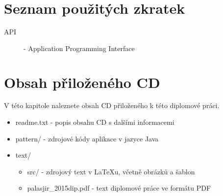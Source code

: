 \documentclass[11pt,twoside,a4paper]{book}
\begin{document}
\appendix


\chapter{Seznam použitých zkratek}

\begin{description}
\item[API] - Application Programming Interface 
\end{description}

\chapter{Obsah přiloženého CD}
V této kapitole naleznete obsah CD přiloženého k této diplomové práci.

\begin{itemize}
	\item readme.txt - popis obsahu CD s dalšími informacemi
	\item pattern/ - zdrojové kódy aplikace v jazyce Java
	\item text/
	\begin{itemize}
		\item src/ - zdrojový text v LaTeXu, včetně obrázků a šablon
		\item palasjir\_2015dip.pdf - text diplomové práce ve formátu PDF
	\end{itemize} 
\end{itemize}
\end{document}

